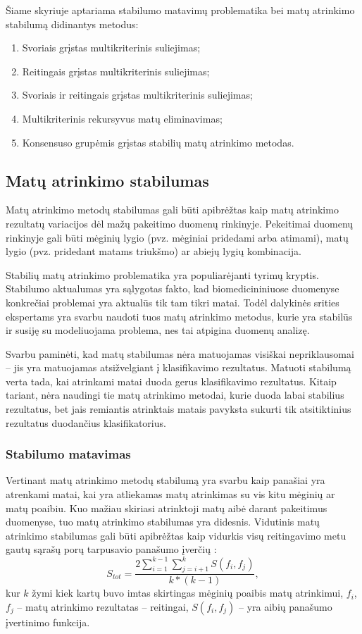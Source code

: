 Šiame skyriuje aptariama stabilumo matavimų problematika bei matų atrinkimo stabilumą didinantys metodus:
\begin{enumerate}
 \item Svoriais grįstas multikriterinis suliejimas;
 \item Reitingais grįstas multikriterinis suliejimas;
 \item Svoriais ir reitingais grįstas multikriterinis suliejimas;
 \item Multikriterinis rekursyvus matų eliminavimas;
 \item Konsensuso grupėmis grįstas stabilių matų atrinkimo metodas.
\end{enumerate}

\subsection{Matų atrinkimo stabilumas}

Matų atrinkimo metodų stabilumas gali būti apibrėžtas kaip matų atrinkimo rezultatų variacijos dėl mažų pakeitimo duomenų rinkinyje. Pekeitimai duomenų rinkinyje gali būti mėginių lygio (pvz. mėginiai pridedami arba atimami), matų lygio (pvz. pridedant matams triukšmo) ar abiejų lygių kombinacija.

Stabilių matų atrinkimo problematika yra populiarėjanti tyrimų kryptis. Stabilumo aktualumas yra sąlygotas fakto, kad biomedicininiuose duomenyse konkrečiai problemai yra aktualūs tik tam tikri matai. Todėl dalykinės srities ekspertams yra svarbu naudoti tuos matų atrinkimo metodus, kurie yra stabilūs ir susiję su modeliuojama problema, nes tai atpigina duomenų analizę. 

Svarbu paminėti, kad matų stabilumas nėra matuojamas visiškai nepriklausomai -- jis yra matuojamas atsižvelgiant į klasifikavimo rezultatus. Matuoti stabilumą verta tada, kai atrinkami matai duoda gerus klasifikavimo rezultatus. Kitaip tariant, nėra naudingi tie matų atrinkimo metodai, kurie duoda labai stabilius rezultatus, bet jais remiantis atrinktais matais pavyksta sukurti tik atsitiktinius rezultatus duodančius klasifikatorius.

\subsubsection{Stabilumo matavimas}

Vertinant matų atrinkimo metodų stabilumą yra svarbu kaip panašiai yra atrenkami matai, kai yra atliekamas matų atrinkimas su vis kitu mėginių ar matų poaibiu. Kuo mažiau skiriasi atrinktoji matų aibė darant pakeitimus duomenyse, tuo matų atrinkimo stabilumas yra didesnis. Vidutinis matų atrinkimo stabilumas gali būti apibrėžtas kaip vidurkis visų reitingavimo metu gautų sąrašų porų tarpusavio panašumo įverčių \cite{kalousis2007stability}:
\begin{equation}
 S_{tot}=\frac{2\sum_{i=1}^{k-1}\sum_{j=i+1}^{k} S(f_i, f_j)}{k*(k-1)},
\end{equation} 
kur $k$ žymi kiek kartų buvo imtas skirtingas mėginių poaibis matų atrinkimui,
$f_i$, $f_j$ -- matų atrinkimo rezultatas -- reitingai, 
$S(f_i, f_j)$ -- yra aibių panašumo įvertinimo funkcija.

